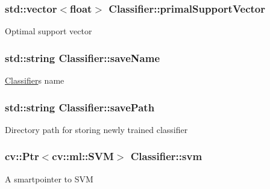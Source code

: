 \subsubsection[{\texorpdfstring{primal\+Support\+Vector}{primalSupportVector}}]{\setlength{\rightskip}{0pt plus 5cm}std\+::vector$<$float$>$ Classifier\+::primal\+Support\+Vector\hspace{0.3cm}{\ttfamily [protected]}}\hypertarget{classClassifier_a41efa32019093c378ad37865d6bf7e02}{}\label{classClassifier_a41efa32019093c378ad37865d6bf7e02}
Optimal support vector 
\subsubsection[{\texorpdfstring{save\+Name}{saveName}}]{\setlength{\rightskip}{0pt plus 5cm}std\+::string Classifier\+::save\+Name\hspace{0.3cm}{\ttfamily [protected]}}\hypertarget{classClassifier_af53d139eac3ac347c09f6a393f5e81b7}{}\label{classClassifier_af53d139eac3ac347c09f6a393f5e81b7}
\hyperlink{classClassifier}{Classifier}\textquotesingle{}s name 
\subsubsection[{\texorpdfstring{save\+Path}{savePath}}]{\setlength{\rightskip}{0pt plus 5cm}std\+::string Classifier\+::save\+Path\hspace{0.3cm}{\ttfamily [protected]}}\hypertarget{classClassifier_aaa3b30538132f9de620f4288c4bdbcf7}{}\label{classClassifier_aaa3b30538132f9de620f4288c4bdbcf7}
Directory path for storing newly trained classifier 
\subsubsection[{\texorpdfstring{svm}{svm}}]{\setlength{\rightskip}{0pt plus 5cm}cv\+::\+Ptr$<$cv\+::ml\+::\+S\+VM$>$ Classifier\+::svm\hspace{0.3cm}{\ttfamily [protected]}}\hypertarget{classClassifier_aa2a02de13d4ed5c5e66a8beb18b995c2}{}\label{classClassifier_aa2a02de13d4ed5c5e66a8beb18b995c2}
A smartpointer to S\+VM 

